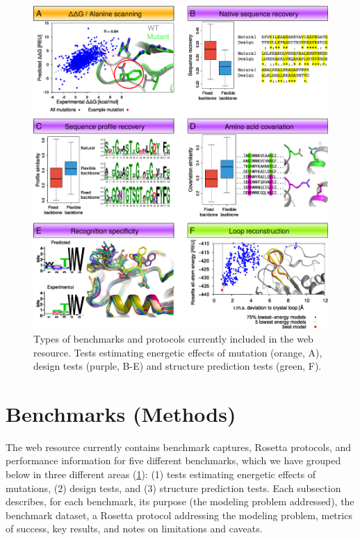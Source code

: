 \begin{figure}[H]
  \centering

  \includegraphics[width=\textwidth,keepaspectratio]{figures/benchmark-fig1.eps}
  \caption[Types of benchmarks and protocols currently included in the web resource]{Types of benchmarks and protocols currently included in the web resource. Tests estimating energetic effects of mutation (orange, A), design tests (purple, B-E) and structure prediction tests (green, F).}
  \label{fig:benchmark-overview}
\end{figure}

\section{Benchmarks (Methods)}

The web resource currently contains benchmark captures, Rosetta protocols, and performance information for five different benchmarks, which we have grouped below in three different areas (\cref{fig:benchmark-overview}): (1) tests estimating energetic effects of mutations, (2) design tests, and (3) structure prediction tests. Each subsection describes, for each benchmark, its purpose (the modeling problem addressed), the benchmark dataset, a Rosetta protocol addressing the modeling problem, metrics of success, key results, and notes on limitations and caveats.

